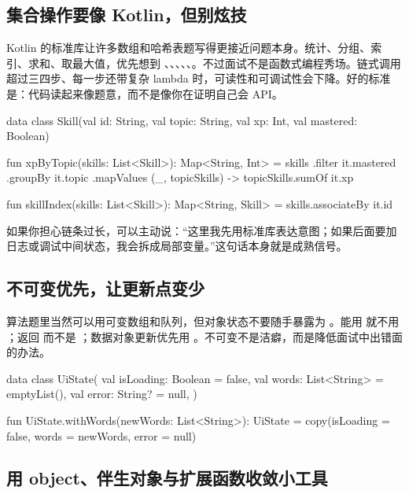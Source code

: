 \subsection*{集合操作要像 Kotlin，但别炫技}

Kotlin 的标准库让许多数组和哈希表题写得更接近问题本身。统计、分组、索引、求和、取最大值，优先想到 、、、、、。不过面试不是函数式编程秀场。链式调用超过三四步、每一步还带复杂 lambda 时，可读性和可调试性会下降。好的标准是：代码读起来像题意，而不是像你在证明自己会 API。

\begin{kotlin}
data class Skill(val id: String, val topic: String, val xp: Int, val mastered: Boolean)

fun xpByTopic(skills: List<Skill>): Map<String, Int> =
    skills
        .filter { it.mastered }
        .groupBy { it.topic }
        .mapValues { (_, topicSkills) -> topicSkills.sumOf { it.xp } }

fun skillIndex(skills: List<Skill>): Map<String, Skill> =
    skills.associateBy { it.id }
\end{kotlin}

如果你担心链条过长，可以主动说：“这里我先用标准库表达意图；如果后面要加日志或调试中间状态，我会拆成局部变量。”这句话本身就是成熟信号。

\subsection*{不可变优先，让更新点变少}

算法题里当然可以用可变数组和队列，但对象状态不要随手暴露为 。能用  就不用 ；返回  而不是 ；数据对象更新优先用 。不可变不是洁癖，而是降低面试中出错面的办法。

\begin{kotlin}
data class UiState(
    val isLoading: Boolean = false,
    val words: List<String> = emptyList(),
    val error: String? = null,
)

fun UiState.withWords(newWords: List<String>): UiState =
    copy(isLoading = false, words = newWords, error = null)
\end{kotlin}

\subsection*{用 object、伴生对象与扩展函数收敛小工具}

